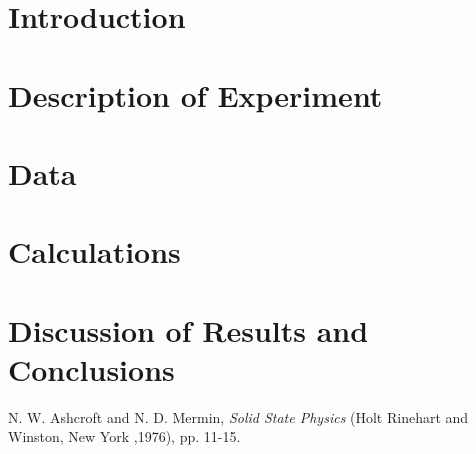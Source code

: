 \documentclass[11pt]{article}
\numberwithin{equation}{section}
\begin{document}


\section{Introduction}

\section{Description of Experiment}

\section{Data}

\section{Calculations}

\section{Discussion of Results and Conclusions}

\begin{thebibliography}{99}
  N. W. Ashcroft and N. D. Mermin, \emph{Solid State Physics} (Holt Rinehart and Winston, New York ,1976), pp. 11-15.
\end{thebibliography}
\end{document}

